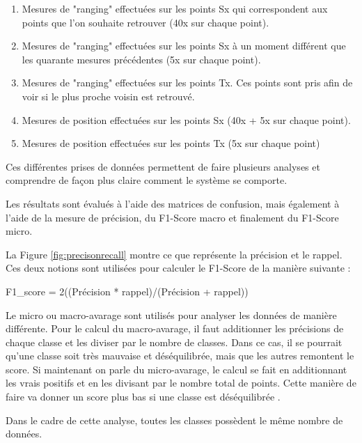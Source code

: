 \begin{enumerate}
 \item Mesures de "ranging" effectuées sur les points Sx qui correspondent aux points que l'on souhaite retrouver (40x sur chaque point).
 \item Mesures de "ranging" effectuées sur les points Sx à un moment différent que les quarante mesures précédentes (5x sur chaque point).
 \item Mesures de "ranging" effectuées sur les points Tx. Ces points sont pris afin de voir si le plus proche voisin est retrouvé.
 \item Mesures de position effectuées sur les points Sx (40x + 5x sur chaque point).
 \item Mesures de position effectuées sur les points Tx (5x sur chaque point) 
\end{enumerate}

Ces différentes prises de données permettent de faire plusieurs analyses et comprendre de façon plus claire comment le système se comporte.

Les résultats sont évalués à l'aide des matrices de confusion, mais également à l'aide de la mesure de précision, du F1-Score macro et finalement du F1-Score micro. 

La Figure \ref{fig:precisonrecall} montre ce que représente la précision et le rappel. Ces deux notions sont utilisées pour calculer le F1-Score de la manière suivante :

F1\_score = 2((Précision * rappel)/(Précision + rappel))

Le micro ou macro-avarage sont utilisés pour analyser les données de manière différente. Pour le calcul du macro-avarage, il faut additionner les précisions de chaque classe et les diviser par le nombre de classes. Dans ce cas, il se pourrait qu'une classe soit très mauvaise et déséquilibrée, mais que les autres remontent le score. Si maintenant on parle du micro-avarage, le calcul se fait en additionnant les vrais positifs et en les divisant par le nombre total de points. Cette manière de faire va donner un score plus bas si une classe est déséquilibrée \cite{DATASCI}. 

Dans le cadre de cette analyse, toutes les classes possèdent le même nombre de données.

